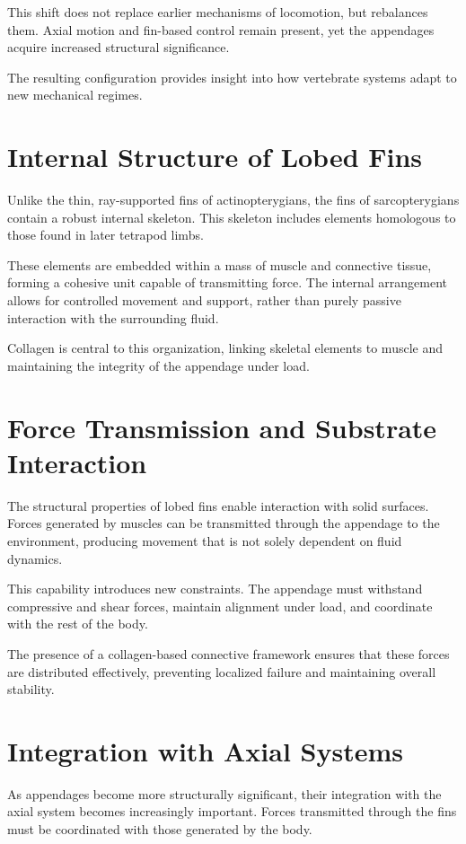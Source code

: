 \documentclass[11pt,oneside]{book}
\begin{document}
This shift does not replace earlier mechanisms of locomotion, but rebalances them. Axial motion and fin-based control remain present, yet the appendages acquire increased structural significance.

The resulting configuration provides insight into how vertebrate systems adapt to new mechanical regimes.

\section{Internal Structure of Lobed Fins}

Unlike the thin, ray-supported fins of actinopterygians, the fins of sarcopterygians contain a robust internal skeleton. This skeleton includes elements homologous to those found in later tetrapod limbs.

These elements are embedded within a mass of muscle and connective tissue, forming a cohesive unit capable of transmitting force. The internal arrangement allows for controlled movement and support, rather than purely passive interaction with the surrounding fluid.

Collagen is central to this organization, linking skeletal elements to muscle and maintaining the integrity of the appendage under load.

\section{Force Transmission and Substrate Interaction}

The structural properties of lobed fins enable interaction with solid surfaces. Forces generated by muscles can be transmitted through the appendage to the environment, producing movement that is not solely dependent on fluid dynamics.

This capability introduces new constraints. The appendage must withstand compressive and shear forces, maintain alignment under load, and coordinate with the rest of the body.

The presence of a collagen-based connective framework ensures that these forces are distributed effectively, preventing localized failure and maintaining overall stability.

\section{Integration with Axial Systems}

As appendages become more structurally significant, their integration with the axial system becomes increasingly important. Forces transmitted through the fins must be coordinated with those generated by the body.
\end{document}
